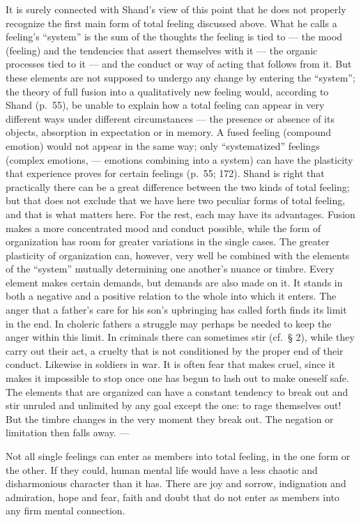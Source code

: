\documentclass[12pt]{book}
\newcommand{\opage}[1]{\marginnote{\footnotesize\textit{[#1]}}}
\begin{document}
It is surely connected with Shand's view of this point that he does not properly
recognize the first main form of total feeling discussed above. What he calls a
feeling's ``system''
is the sum of the thoughts the feeling is tied to --- the mood (feeling) and the
tendencies that assert themselves with it --- the organic processes tied to it
--- and the conduct or way of acting that follows from it. But these elements are
not supposed to undergo any change by entering the ``system''; the theory of full
fusion into a qualitatively new feeling would, according to Shand (p.~55), be
unable to explain how a total feeling can appear in very different ways under
different circumstances --- the presence or absence of its objects, absorption in
expectation or in memory. A fused feeling (compound emotion) would not appear in
the same way; only ``systematized'' feelings (complex emotions, --- emotions
combining into a system) can have the plasticity that experience proves for
certain feelings (p.~55; 172). Shand is right that practically there can be a
great difference between the two kinds of total feeling; but that does not
exclude that we have here two peculiar forms of total feeling, and that is what
matters here. For the rest, each may have its advantages. Fusion makes a more
concentrated mood and conduct possible, while the form of organization has room
for greater variations in the single cases. The greater plasticity of
organization can, however, very well be combined with the elements of the
``system'' mutually determining one another's nuance or timbre. Every element
makes certain demands, but demands are also made on \opage{33}it. It stands in
both a negative and a positive relation to the whole into which it enters. The
anger that a father's care for his son's upbringing has called forth finds its
limit in the end. In choleric fathers a struggle may perhaps be needed to keep
the anger within this limit. In criminals there can sometimes stir (cf.\ § 2),
while they carry out their act, a cruelty that is not conditioned by the proper
end of their conduct. Likewise in soldiers in war. It is often fear that makes
cruel, since it makes it impossible to stop once one has begun to lash out to
make oneself safe. The elements that are organized can have a constant tendency
to break out and stir unruled and unlimited by any goal except the one: to rage
themselves out! But the timbre changes in the very moment they break out. The
negation or limitation then falls away. ---

Not all single feelings can enter as members into total feeling, in the one form
or the other. If they could, human mental life would have a less chaotic and
disharmonious character than it has. There are joy and sorrow, indignation and
admiration, hope and fear, faith and doubt that do not enter as members into any
firm mental connection.
\end{document}
